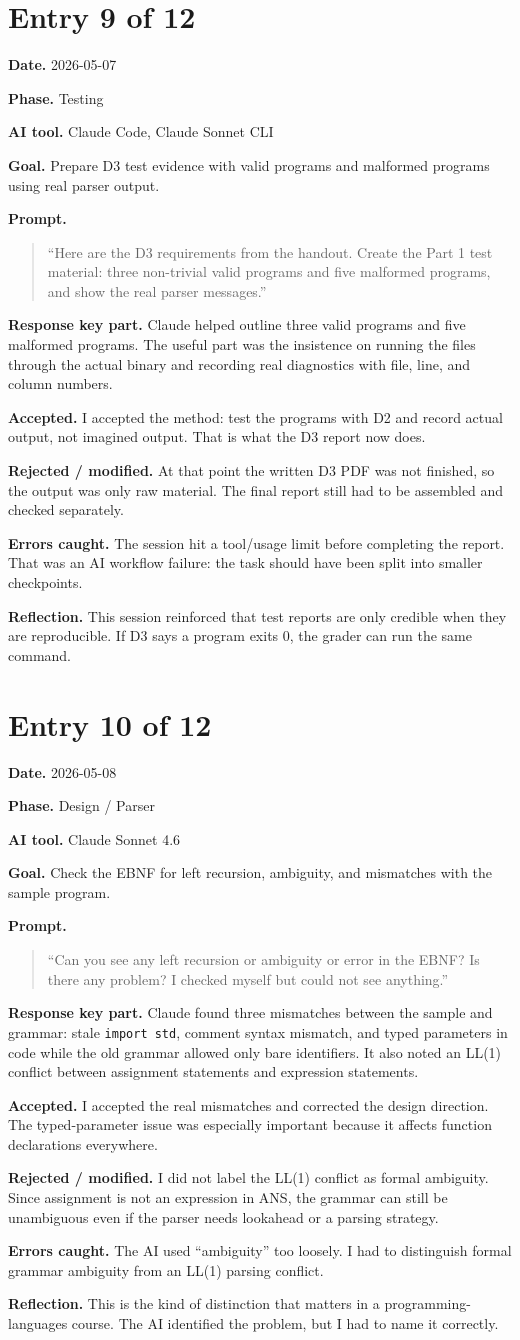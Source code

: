 \documentclass[11pt,a4paper]{article}
\newcommand{\code}[1]{\texttt{#1}}
\newcommand{\field}[2]{\textbf{#1.} #2\par}
\newcommand{\prompt}[1]{%
  \textbf{Prompt.}
  \begin{quote}\small #1\end{quote}
}
\begin{document}
\section{Entry 9 of 12}
\field{Date}{2026-05-07}
\field{Phase}{Testing}
\field{AI tool}{Claude Code, Claude Sonnet CLI}
\field{Goal}{Prepare D3 test evidence with valid programs and malformed programs using real parser output.}
\prompt{``Here are the D3 requirements from the handout. Create the Part 1 test material: three non-trivial valid programs and five malformed programs, and show the real parser messages.''}
\field{Response key part}{Claude helped outline three valid programs and five malformed programs. The useful part was the insistence on running the files through the actual binary and recording real diagnostics with file, line, and column numbers.}
\field{Accepted}{I accepted the method: test the programs with D2 and record actual output, not imagined output. That is what the D3 report now does.}
\field{Rejected / modified}{At that point the written D3 PDF was not finished, so the output was only raw material. The final report still had to be assembled and checked separately.}
\field{Errors caught}{The session hit a tool/usage limit before completing the report. That was an AI workflow failure: the task should have been split into smaller checkpoints.}
\field{Reflection}{This session reinforced that test reports are only credible when they are reproducible. If D3 says a program exits 0, the grader can run the same command.}

\section{Entry 10 of 12}
\field{Date}{2026-05-08}
\field{Phase}{Design / Parser}
\field{AI tool}{Claude Sonnet 4.6}
\field{Goal}{Check the EBNF for left recursion, ambiguity, and mismatches with the sample program.}
\prompt{``Can you see any left recursion or ambiguity or error in the EBNF? Is there any problem? I checked myself but could not see anything.''}
\field{Response key part}{Claude found three mismatches between the sample and grammar: stale \code{import std}, comment syntax mismatch, and typed parameters in code while the old grammar allowed only bare identifiers. It also noted an LL(1) conflict between assignment statements and expression statements.}
\field{Accepted}{I accepted the real mismatches and corrected the design direction. The typed-parameter issue was especially important because it affects function declarations everywhere.}
\field{Rejected / modified}{I did not label the LL(1) conflict as formal ambiguity. Since assignment is not an expression in ANS, the grammar can still be unambiguous even if the parser needs lookahead or a parsing strategy.}
\field{Errors caught}{The AI used ``ambiguity'' too loosely. I had to distinguish formal grammar ambiguity from an LL(1) parsing conflict.}
\field{Reflection}{This is the kind of distinction that matters in a programming-languages course. The AI identified the problem, but I had to name it correctly.}
\end{document}
